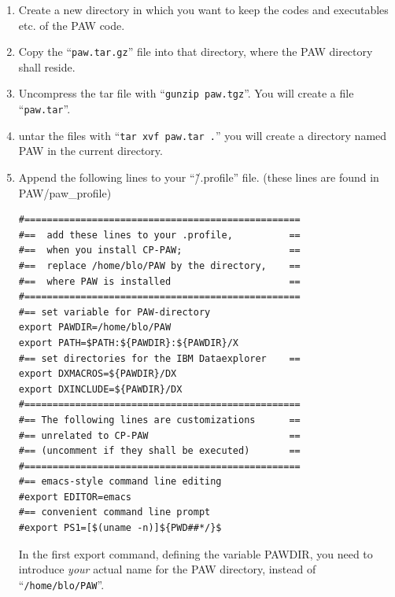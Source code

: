 \documentclass[final,12pt]{article}
\begin{document}
\begin{enumerate}
\item Create a new directory in which you want to keep the codes and
  executables etc. of the PAW code.
\item Copy the ``{\tt paw.tar.gz}'' file into that directory, where
  the PAW directory shall reside.
\item 
\begin{sloppypar}
Uncompress the tar file with ``{\tt gunzip paw.tgz}''. You will create
a file ``{\tt paw.tar}''.
\end{sloppypar}
\item  untar the files with ``{\tt tar xvf paw.tar .}'' you will
  create a directory named PAW in the current directory.
\item Append the following lines to your
  ``\~/.profile'' file.  (these lines are found in PAW/paw\_profile)
 \begin{verbatim}
#=================================================
#==  add these lines to your .profile,          ==
#==  when you install CP-PAW;                   ==
#==  replace /home/blo/PAW by the directory,    ==
#==  where PAW is installed                     ==
#=================================================
#== set variable for PAW-directory
export PAWDIR=/home/blo/PAW           
export PATH=$PATH:${PAWDIR}:${PAWDIR}/X
#== set directories for the IBM Dataexplorer    ==
export DXMACROS=${PAWDIR}/DX
export DXINCLUDE=${PAWDIR}/DX
#=================================================
#== The following lines are customizations      ==
#== unrelated to CP-PAW                         ==
#== (uncomment if they shall be executed)       ==
#=================================================
#== emacs-style command line editing
#export EDITOR=emacs                  
#== convenient command line prompt
#export PS1=[$(uname -n)]${PWD##*/}$  
 \end{verbatim}
 In the first export command, defining the variable PAWDIR, you need
 to introduce {\em your} actual name for the PAW directory, instead of
 ``{\tt /home/blo/PAW}''. 


\end{enumerate}
\end{document}
